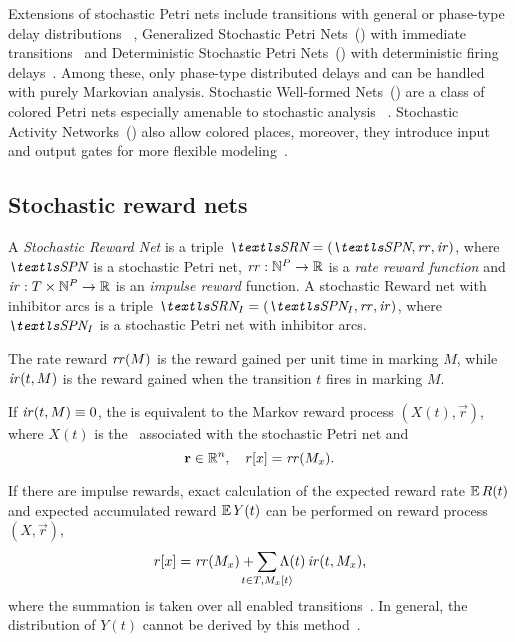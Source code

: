 Extensions of stochastic Petri nets include transitions with general
or phase-type delay distributions%
~\citep{DBLP:journals/tse/MarsanBBCCC89,Longo:2015:TSR:2767455.2767457},
Generalized Stochastic Petri Nets~() with immediate
transitions~\citep{DBLP:journals/tocs/MarsanCB84,DBLP:journals/tse/TeruelFP03}
and Deterministic Stochastic Petri Nets~() with
deterministic firing delays~\citep{DBLP:conf/apn/1986}. Among these,
only phase-type distributed delays and  can be handled
with purely Markovian analysis. Stochastic Well-formed
Nets~() are a class of colored Petri nets especially
amenable to stochastic analysis%
~\citep{DBLP:journals/tc/ChiolaDFH93}. Stochastic Activity
Networks~() also allow colored places, moreover, they
introduce input and output gates for more flexible
modeling~\citep{DBLP:conf/pnpm/1985}.

\subsection{Stochastic reward nets}

\begin{dfn}
  \label{dfn:background:srn}
  A \emph{Stochastic Reward Net} is a triple
  $\SRN = (\SPN, \rateReward, \impulseReward)$, where $\SPN$ is a
  stochastic Petri net,
  $\mathit{rr}: \mathbb{N}^P \to \mathbb{R}$ is a \emph{rate reward function} and
  $\mathit{ir}: T \times \mathbb{N}^P \to \mathbb{R}$ is an \emph{impulse reward}
  function. A stochastic Reward net with inhibitor arcs is a triple
  $\SRN_I = (\SPN_I, \rateReward, \impulseReward)$, where $\SPN_I$ is
  a stochastic Petri net with inhibitor arcs.
\end{dfn}

The rate reward $\mathit{rr}(M)$ is the reward gained per unit time in
marking $M$, while $\mathit{ir}(t, M)$ is the reward gained when
the transition $t$ fires in marking $M$.

If $\mathit{ir}(t, M) \equiv 0$, the  is
equivalent to the Markov reward process $(X(t), \vec{r})$, where
$X(t)$ is the \CTMC\ associated with the stochastic Petri net and
\begin{equation}
  \bm{\mathrm{r}} \in \mathbb{R}^n, \quad r[x] = \mathit{rr}(M_x) \text.
\end{equation}

If there are impulse rewards, exact calculation of the expected reward
rate $\operatorname{\mathbb{E}} R(t)$ and expected accumulated reward $\operatorname{\mathbb{E}} Y(t)$ can be
performed on reward process $(X, \vec{r})$,
\begin{equation}
  r[x] = \rateReward(M_x) + \sum_{\mathclap{t \in T, M_x
      \tranto{t}}} \Lambda(t) \, \impulseReward(t, M_x) \text,
\end{equation}
where the summation is taken over all enabled
transitions~\citep{DBLP:journals/pe/CiardoMT91}. In general, the
distribution of $Y(t)$ cannot be derived by this
method~\citep{RACZ99a}.

